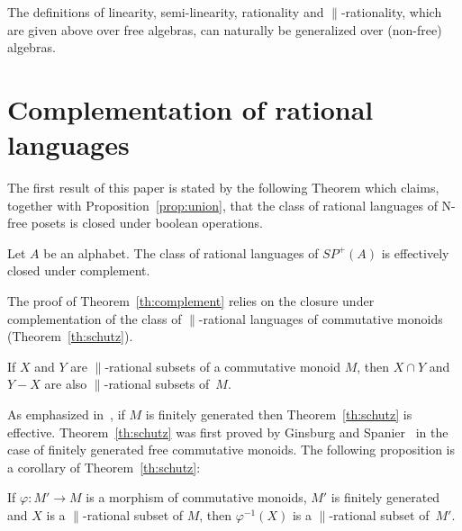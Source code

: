 \documentclass{CSML}
\begin{document}
The definitions of linearity, semi-linearity, rationality and $\parallel$-rationality, which are given above over free algebras, can naturally be generalized over (non-free) algebras.
 
\section{Complementation of rational languages}
\label{sec:complementation}

The first result of this paper is stated by the following Theorem which claims, together with Proposition~\ref{prop:union}, that the class of rational languages of N-free posets is closed under boolean operations.
\begin{thm}
  \label{th:complement}
  Let $A$ be an alphabet.
  The class of rational languages of $SP^+(A)$ is effectively closed under complement.
\end{thm}

The proof of Theorem~\ref{th:complement} relies on the closure under complementation of the class of $\parallel$-rational languages of commutative monoids (Theorem~\ref{th:schutz}).
\begin{thm}
  \label{th:schutz}
  If $X$ and $Y$ are $\parallel$-rational subsets of a commutative monoid $M$, then $X\cap Y$ and $Y-X$ are also $\parallel$-rational subsets of~$M$.
\end{thm}
As emphasized in~\cite{Saka:thAutoFr}, if $M$ is finitely generated then Theorem~\ref{th:schutz} is effective.
Theorem~\ref{th:schutz} was first proved by Ginsburg and Spanier~\cite{GS:AMS64} in the case of finitely generated free commutative monoids. The following proposition is a corollary of Theorem~\ref{th:schutz}:
\begin{prop}
  \label{prop:morphInv}
  If $\varphi:M'\to M$ is a morphism of commutative monoids, $M'$ is finitely generated and $X$ is a $\parallel$-rational subset of $M$, then $\varphi^{-1}(X)$ is a $\parallel$-rational subset of~$M'$.
\end{prop}

\medskip
\end{document}
